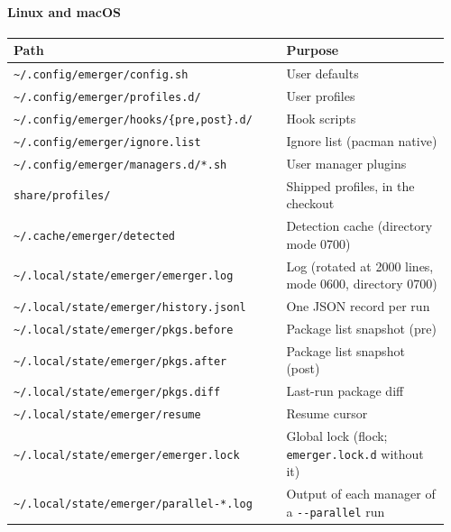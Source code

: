 \documentclass[11pt,a4paper]{article}
\begin{document}
\paragraph{Linux and macOS}
\begin{center}
\begin{tabular}{@{}p{0.60\linewidth} p{0.36\linewidth}@{}}
\toprule
\textbf{Path} & \textbf{Purpose} \\
\midrule
\verb|~/.config/emerger/config.sh|        & User defaults \\
\verb|~/.config/emerger/profiles.d/|      & User profiles \\
\verb|~/.config/emerger/hooks/{pre,post}.d/| & Hook scripts \\
\verb|~/.config/emerger/ignore.list|      & Ignore list (pacman native) \\
\verb|~/.config/emerger/managers.d/*.sh|  & User manager plugins \\
\verb|share/profiles/|                    & Shipped profiles, in the checkout \\
\verb|~/.cache/emerger/detected|          & Detection cache (directory mode 0700) \\
\verb|~/.local/state/emerger/emerger.log| & Log (rotated at 2000 lines, mode 0600, directory 0700) \\
\verb|~/.local/state/emerger/history.jsonl| & One JSON record per run \\
\verb|~/.local/state/emerger/pkgs.before| & Package list snapshot (pre) \\
\verb|~/.local/state/emerger/pkgs.after|  & Package list snapshot (post) \\
\verb|~/.local/state/emerger/pkgs.diff|   & Last-run package diff \\
\verb|~/.local/state/emerger/resume|      & Resume cursor \\
\verb|~/.local/state/emerger/emerger.lock| & Global lock (flock; \verb|emerger.lock.d| without it) \\
\verb|~/.local/state/emerger/parallel-*.log| & Output of each manager of a \texttt{-{}-parallel} run \\
\bottomrule
\end{tabular}
\end{center}
\end{document}
